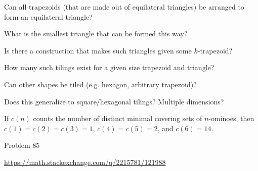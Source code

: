 \documentclass{article}
\begin{document}
\begin{question}
  Can all trapezoids (that are made out of equilateral triangles) be arranged to
  form an equilateral triangle?
\end{question}

\begin{related}
  \item What is the smallest triangle that can be formed this way?
  \item Is there a construction that makes such triangles given some $k$-trapezoid?
  \item How many such tilings exist for a given size trapezoid and triangle?
  \item Can other shapes be tiled (e.g. hexagon, arbitrary trapezoid)?
  \item Does this generalize to square/hexagonal tilings? Multiple dimensions?
\end{related}

\begin{note}
  If $c(n)$ counts the number of distinct minimal covering sets of $n$-ominoes,
  then $c(1) = c(2) = c(3) = 1$, $c(4) = c(5) = 2$, and $c(6) = 14$.
\end{note}

\begin{references}
  \item Problem 85
  \item \url{https://math.stackexchange.com/q/2215781/121988}
\end{references}
\end{document}
